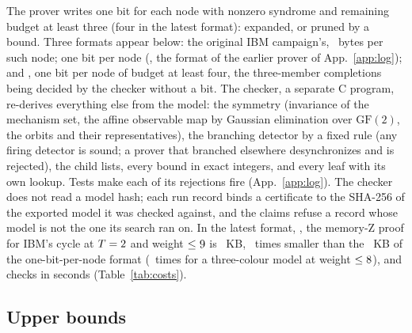 \documentclass[aps,pra,twocolumn,superscriptaddress,nofootinbib,longbibliography,floatfix]{revtex4-2}
\newcommand{\GF}{\mathrm{GF}(2)}
\begin{document}
The prover writes one bit for each node with nonzero syndrome and remaining budget at least three (four in the latest format): expanded, or pruned by a bound. Three formats appear below: the original IBM campaign's, \IbmBytesPerEntry\ bytes per such node; one bit per node (\RecertOldMagic, the format of the earlier prover of App.~\ref{app:log}); and \CdpFiveName, one bit per node of budget at least four, the three-member completions being decided by the checker without a bit. The checker, a separate C program, re-derives everything else from the model: the symmetry (invariance of the mechanism set, the affine observable map by Gaussian elimination over $\GF$, the orbits and their representatives), the branching detector by a fixed rule (any firing detector is sound; a prover that branched elsewhere desynchronizes and is rejected), the child lists, every bound in exact integers, and every leaf with its own lookup. Tests make each of its rejections fire (App.~\ref{app:log}). The checker does not read a model hash; each run record binds a certificate to the SHA-256 of the exported model it was checked against, and the claims refuse a record whose model is not the one its search ran on. In the latest format, \CdpFiveName, the memory-Z proof for IBM's cycle at $T=2$ and weight $\le9$ is \CdpIbmZKB~KB, \CdpIbmRatio\ times smaller than the \CdpIbmBaseKB~KB of the one-bit-per-node format (\CdpTcRatio\ times for a three-colour model at weight $\le8$), and checks in seconds (Table~\ref{tab:costs}).

\begin{table}[tbp]
\caption{Certificate sizes and times for representative models. \emph{Mechanisms} are those of the projected model; $w$ is the certified weight bound. The first two rows are certificates of the original IBM campaign, on which nothing in the results rests (App.~\ref{app:log}); the \CdpFiveName\ rows are later benchmark runs on the same two models. The three-colour and morphing rows are the \CdpFiveName\ proofs of the re-certification, written and checked by the committed prover and checker (Sec.~\ref{sec:trusted}). Times are wall-clock on one workstation with several threads on a loaded machine, not controlled benchmarks.}
\label{tab:costs}
\small\setlength{\tabcolsep}{8pt}

\end{table}

\subsection{Upper bounds}
\end{document}
